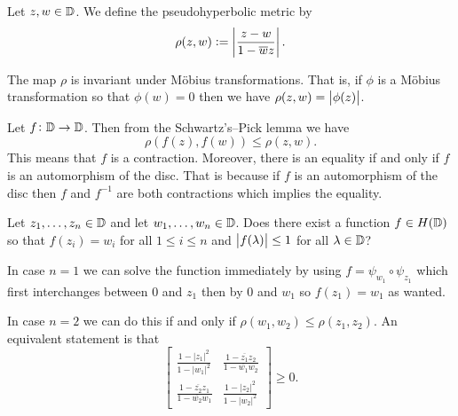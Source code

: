 \documentclass[11pt,a4paper]{article}
\begin{document}
\begin{definition}
  Let $z,w \in \mathbb{D}$.
  We define the pseudohyperbolic metric by
  \[
    \rho(z,w) := \left\lvert\frac{z - w}{1 - \overline{w} z}\right\rvert.
  \]
\end{definition}
\begin{remark}
  The map $\rho$ is invariant under M\"obius transformations.
  That is, if $\phi$ is a M\"obius transformation so that $\phi(w) = 0$
  then we have $\rho(z,w) = \left\lvert\phi(z)\right\rvert$.
\end{remark}

\begin{remark}
  Let $f \colon \mathbb{D} \to \mathbb{D}$.
  Then from the Schwartz's--Pick lemma we have
  \[
    \rho(f(z),f(w)) \le \rho(z,w).
  \]
  This means that $f$ is a contraction.
  Moreover, there is an equality if and only if $f$ is
  an automorphism of the disc.
  That is because if $f$ is an automorphism of the disc then $f$ and
  $f^{-1}$ are both contractions which implies the equality.
\end{remark}

\begin{problem}
  \label{problem:picks-interpolaltion-problem}
  Let $z_1,\dots,z_n \in \mathbb{D}$ and let
  $w_1,\dots,w_n \in \mathbb{D}$.
  Does there exist a function 
  $f \in H(\mathbb{D})$ so that
  $f(z_i) = w_i$ for all $1 \le i \le n$
  and $\left\lvert f(\lambda)\right\rvert \le 1$ for all $\lambda \in \mathbb{D}$?
\end{problem}
\begin{remark}
  In case $n = 1$ we can solve the function immediately by
  using $f = \psi_{w_1} \circ \psi_{z_1}$ which first interchanges between
  $0$ and $z_1$ then by $0$ and $w_1$ so $f(z_1) = w_1$ as wanted.
  
  In case $n = 2$ we can do this if and only if
  $\rho(w_1,w_2) \le \rho(z_1,z_2)$.
  An equivalent statement is that
  \[
    \begin{bmatrix}
      \frac {1-|z_{1}|^{2}}{1-|w_{1}|^{2}} &
      \frac {1-{\overline {z_{1}}}z_{2}}{1-{\overline {w_{1}}}w_{2}}
    \\[5pt]
      \frac {1-{\overline {z_{2}}}z_{1}}{1-{\overline {w_{2}}}w_{1}} &
      \frac {1-|z_{2}|^{2}}{1-|w_{2}|^{2}}
    \end{bmatrix}
    \geq 0.
  \]
\end{remark}
\end{document}
